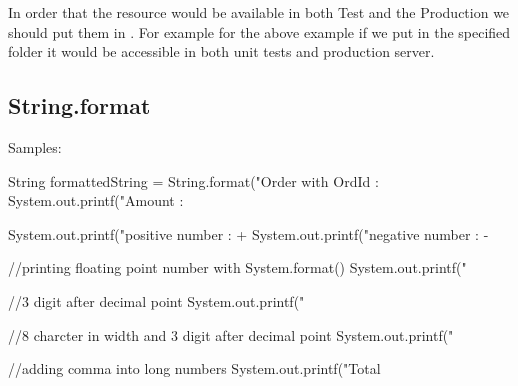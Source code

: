 In order that the resource would be available in both Test and the Production we should put them in . For example for the above example if we put  in the specified folder it would be accessible in both unit tests and production server.
\subsection{String.format}
Samples:

\begin{javacode}
	String formattedString = String.format("Order with OrdId : %
	 System.out.printf("Amount : %
	 
	 System.out.printf("positive number : +%
	 System.out.printf("negative number : -%
	 
	 //printing floating point number with System.format()
	 System.out.printf("%
	 
	 //3 digit after decimal point
	 System.out.printf("%
	 
	 //8 charcter in width and 3 digit after decimal point
	 System.out.printf("%
	 
	 //adding comma into long numbers
	 System.out.printf("Total %
\end{javacode}
